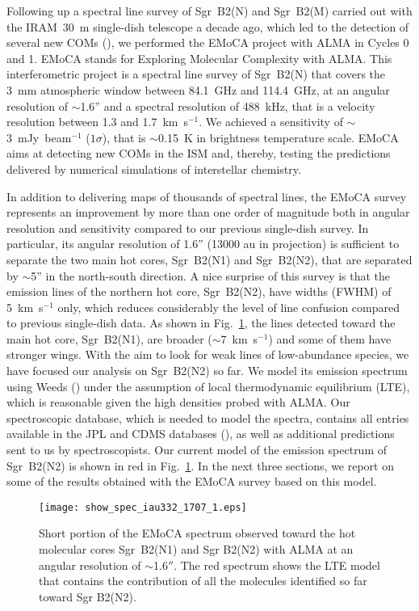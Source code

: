 \documentclass{iau}
\begin{document}
Following up a spectral line survey of Sgr~B2(N) and Sgr~B2(M) carried out 
with the IRAM~30~m single-dish telescope a decade ago, which led to the 
detection of several new COMs (\cite{Belloche08,Belloche09,Belloche13}), we
performed the EMoCA project with ALMA in Cycles 0 and 1. EMoCA stands for 
Exploring Molecular Complexity with ALMA. This interferometric project is a 
spectral line 
survey of Sgr~B2(N) that covers the 3~mm atmospheric window between 
84.1~GHz and 114.4~GHz, at an angular resolution of $\sim$1.6'' and
a spectral resolution of 488~kHz, that is a velocity resolution between 1.3
and 1.7~km~s$^{-1}$. We achieved a sensitivity of $\sim$3~mJy~beam$^{-1}$ 
($1\sigma$), that is $\sim$0.15~K in brightness temperature scale.
EMoCA aims at detecting new COMs in the ISM and, thereby, testing the 
predictions delivered by numerical simulations of interstellar chemistry.

In addition to delivering maps of thousands of spectral lines, the EMoCA 
survey represents an improvement by more than one order of magnitude both in
angular resolution and sensitivity compared to our previous single-dish 
survey. In particular, its angular resolution of 1.6'' (13000 au in 
projection) is sufficient to separate the two main hot cores, Sgr~B2(N1) and 
Sgr~B2(N2), that are separated by $\sim$5'' in the north-south direction. A 
nice surprise of this survey is that the emission lines of the northern hot 
core, Sgr~B2(N2), have widths (FWHM) of 5~km~s$^{-1}$ only, which reduces 
considerably the level of line confusion compared to previous single-dish data.
As shown in Fig.~\ref{f:specn1n2}, the lines detected toward the main hot core,
Sgr~B2(N1), are broader ($\sim 7$~km~s$^{-1}$) and some of them have stronger 
wings. With the aim to look for weak lines of low-abundance species, we have
focused our analysis on Sgr~B2(N2) so far. We model its emission spectrum
using Weeds (\cite{Maret11}) under the assumption of local thermodynamic 
equilibrium (LTE), which is reasonable given the high densities probed with 
ALMA. Our spectroscopic database, which is needed to model the spectra, 
contains all entries available in the JPL and CDMS databases 
(\cite{Pickett98,Mueller01,Endres16}), as well as additional predictions sent 
to us by spectroscopists. Our current model of the emission spectrum of 
Sgr~B2(N2) is shown in red in Fig.~\ref{f:specn1n2}.
In the next three sections, we report on some of the results obtained 
with the EMoCA survey based on this model.

\begin{figure}
\begin{center}
\texttt{[image: show\_spec\_iau332\_1707\_1.eps]}
\end{center}
\caption{Short portion of the EMoCA spectrum observed toward the hot molecular 
cores Sgr~B2(N1) and Sgr B2(N2) with ALMA at an angular resolution of 
$\sim$1.6$''$. The red spectrum shows the LTE model that contains the 
contribution of all the molecules identified so far toward Sgr B2(N2).}
\label{f:specn1n2}
\end{figure}
\end{document}
